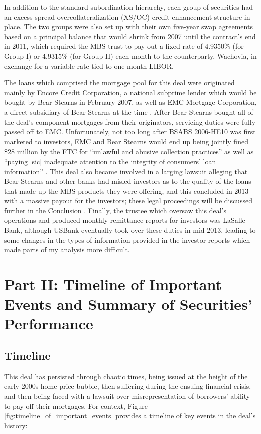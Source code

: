 \documentclass[12pt]{article}
\begin{document}
In addition to the standard subordination hierarchy, each group of securities had an excess spread-overcollateralization (XS/OC) credit enhancement structure in place. The two groups were also set up with their own five-year swap agreements based on a principal balance that would shrink from 2007 until the contract’s end in 2011, which required the MBS trust to pay out a fixed rate of 4.9350\% (for Group I) or 4.9315\% (for Group II) each month to the counterparty, Wachovia, in exchange for a variable rate tied to one-month LIBOR.

The loans which comprised the mortgage pool for this deal were originated mainly by Encore Credit Corporation, a national subprime lender which would be bought by Bear Stearns in February 2007, as well as EMC Mortgage Corporation, a direct subsidiary of Bear Stearns at the time \parencite{cpi09}.  After Bear Stearns bought all of the deal’s component mortgages from their originators, servicing duties were fully passed off to EMC. Unfortunately, not too long after BSABS 2006-HE10 was first marketed to investors, EMC and Bear Stearns would end up being jointly fined \$28 million by the FTC for “unlawful and abusive collection practices” as well as “paying [sic] inadequate attention to the integrity of consumers’ loan information” \parencite{ftc08}. This deal also became involved in a larging lawsuit alleging that Bear Stearns and other banks had misled investors as to the quality of the loans that made up the MBS products they were offering, and this concluded in 2013 with a massive payout for the investors; these legal proceedings will be discussed further in the Conclusion \parencite{doj13}. Finally, the trustee which oversaw this deal’s operations and produced monthly remittance reports for investors was LaSalle Bank, although USBank eventually took over these duties in mid-2013, leading to some changes in the types of information provided in the investor reports which made parts of my analysis more difficult.

\section*{Part II: Timeline of Important Events and Summary of Securities' Performance}

\subsection*{Timeline}

This deal has persisted through chaotic times, being issued at the height of the early-2000s home price bubble, then suffering during the ensuing financial crisis, and then being faced with a lawsuit over misrepresentation of borrowers’ ability to pay off their mortgages. For context, Figure \ref{fig:timeline_of_important_events} provides a timeline of key events in the deal’s history:
\end{document}
